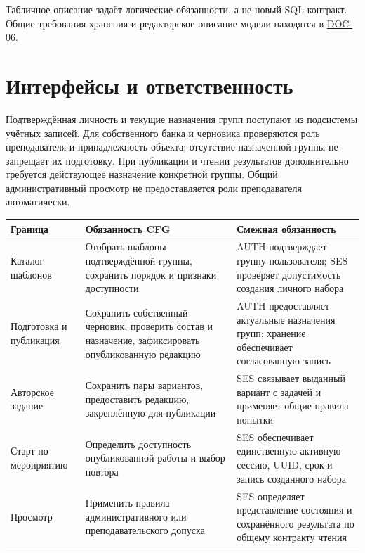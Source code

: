 \documentclass[12pt,a4paper]{article}
\newcounter{none} %
\begin{document}
Табличное описание задаёт логические обязанности, а не новый SQL-контракт. Общие требования хранения и редакторское описание модели находятся в {\href{DOC-06\_Программные\_требования.pdf\#приложение-а-модель-данных}{DOC-06}}.

\section{Интерфейсы и ответственность}\label{3-ux438ux43dux442ux435ux440ux444ux435ux439ux441ux44b-ux438-ux43eux442ux432ux435ux442ux441ux442ux432ux435ux43dux43dux43eux441ux442ux44c}

\hypertarget{3-интерфейсы-и-ответственность}{}

Подтверждённая личность и текущие назначения групп поступают из подсистемы учётных записей. Для собственного банка и черновика проверяются роль преподавателя и принадлежность объекта; отсутствие назначенной группы не запрещает их подготовку. При публикации и чтении результатов дополнительно требуется действующее назначение конкретной группы. Общий административный просмотр не предоставляется роли преподавателя автоматически.

{\def\LTcaptype{none} %
\begin{longtable}[]{@{}
  >{\raggedright\arraybackslash}p{}
  >{\raggedright\arraybackslash}p{}
  >{\raggedright\arraybackslash}p{}@{}}
\toprule\noalign{}
\begin{minipage}[b]{\linewidth}\raggedright
Граница
\end{minipage} & \begin{minipage}[b]{\linewidth}\raggedright
Обязанность CFG
\end{minipage} & \begin{minipage}[b]{\linewidth}\raggedright
Смежная обязанность
\end{minipage} \\
\midrule\noalign{}
\endhead
\bottomrule\noalign{}
\endlastfoot
Каталог шаблонов & Отобрать шаблоны подтверждённой группы, сохранить порядок и признаки доступности & AUTH подтверждает группу пользователя; SES проверяет допустимость создания личного набора \\
Подготовка и публикация & Сохранить собственный черновик, проверить состав и назначение, зафиксировать опубликованную редакцию & AUTH предоставляет актуальные назначения групп; хранение обеспечивает согласованную запись \\
Авторское задание & Сохранить пары вариантов, предоставить редакцию, закреплённую для публикации & SES связывает выданный вариант с задачей и применяет общие правила попытки \\
Старт по мероприятию & Определить доступность опубликованной работы и выбор повтора & SES обеспечивает единственную активную сессию, UUID, срок и запись созданного набора \\
Просмотр & Применить правила административного или преподавательского допуска & SES определяет представление состояния и сохранённого результата по общему контракту чтения \\
\end{longtable}
}
\end{document}
